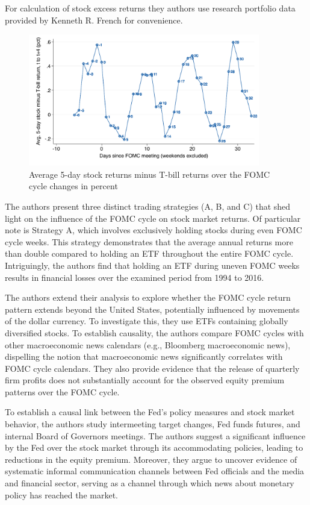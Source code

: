 For calculation of stock excess returns they authors use research portfolio data provided by Kenneth R. French for convenience.  \parencite{kenneth_r_kenneth_nodate}

\label{cies19_fig1}
\begin{figure}[h]
    \centering
    \includegraphics[width=0.9\textwidth]{figures/cies19/fig1}
    \caption{Average 5-day stock returns minus T-bill returns over the FOMC cycle changes in percent \parencite{cieslak_stock_2019} }
\end{figure}

The authors present three distinct trading strategies (A, B, and C) that shed light on the influence of the FOMC cycle on stock market returns. Of particular note is Strategy A, which involves exclusively holding stocks during even FOMC cycle weeks. This strategy demonstrates that the average annual returns more than double compared to holding an ETF throughout the entire FOMC cycle. Intriguingly, the authors find that holding an ETF during uneven FOMC weeks results in financial losses over the examined period from 1994 to 2016.

The authors extend their analysis to explore whether the FOMC cycle return pattern extends beyond the United States, potentially influenced by movements of the dollar currency. To investigate this, they use ETFs containing globally diversified stocks. To establish causality, the authors compare FOMC cycles with other macroeconomic news calendars (e.g., Bloomberg macroeconomic news), dispelling the notion that macroeconomic news significantly correlates with FOMC cycle calendars. They also provide evidence that the release of quarterly firm profits does not substantially account for the observed equity premium patterns over the FOMC cycle.

To establish a causal link between the Fed's policy measures and stock market behavior, the authors study intermeeting target changes, Fed funds futures, and internal Board of Governors meetings. The authors suggest a significant influence by the Fed over the stock market through its accommodating policies, leading to reductions in the equity premium. Moreover, they argue to uncover evidence of systematic informal communication channels between Fed officials and the media and financial sector, serving as a channel through which news about monetary policy has reached the market.

